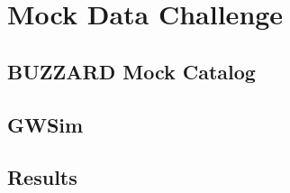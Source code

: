 \chapter{Mock Data Challenge}
\label{chap:MDC}

\section{BUZZARD Mock Catalog}

\section{GWSim}

\section{Results}